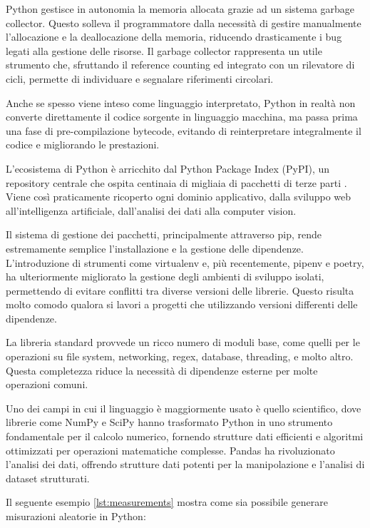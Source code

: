 Python gestisce in autonomia la memoria allocata grazie ad un sistema garbage collector. Questo solleva il programmatore dalla necessità di gestire manualmente l'allocazione e la deallocazione della memoria, riducendo drasticamente i bug legati alla gestione delle risorse. Il garbage collector rappresenta un utile strumento che, sfruttando il reference counting ed integrato con un rilevatore di cicli, permette di individuare e segnalare riferimenti circolari.

Anche se spesso viene inteso come linguaggio interpretato, Python in realtà non converte direttamente il codice sorgente in linguaggio macchina, ma passa prima una fase di pre-compilazione bytecode, evitando di reinterpretare integralmente il codice e migliorando le prestazioni.

L'ecosistema di Python è arricchito dal Python Package Index (PyPI), un repository centrale che ospita centinaia di migliaia di pacchetti di terze parti \citep{pypi_2023}. Viene così  praticamente ricoperto ogni dominio applicativo, dalla sviluppo web all'intelligenza artificiale, dall'analisi dei dati alla computer vision.

Il sistema di gestione dei pacchetti, principalmente attraverso pip, rende estremamente semplice l'installazione e la gestione delle dipendenze. L'introduzione di strumenti come virtualenv e, più recentemente, pipenv e poetry, ha ulteriormente migliorato la gestione degli ambienti di sviluppo isolati, permettendo di evitare conflitti tra diverse versioni delle librerie. Questo risulta molto comodo qualora si lavori a progetti che utilizzando versioni differenti delle dipendenze.

La libreria standard provvede un ricco numero di moduli base, come quelli per le operazioni su file system, networking, regex, database, threading, e molto altro. Questa completezza riduce la necessità di dipendenze esterne per molte operazioni comuni.

Uno dei campi in cui il linguaggio è maggiormente usato è quello scientifico, dove librerie come NumPy e SciPy hanno trasformato Python in uno strumento fondamentale per il calcolo numerico, fornendo strutture dati efficienti e algoritmi ottimizzati per operazioni matematiche complesse. Pandas ha rivoluzionato l'analisi dei dati, offrendo strutture dati potenti per la manipolazione e l'analisi di dataset strutturati.

Il seguente esempio \ref{lst:measurements} mostra come sia possibile generare misurazioni aleatorie in Python:

